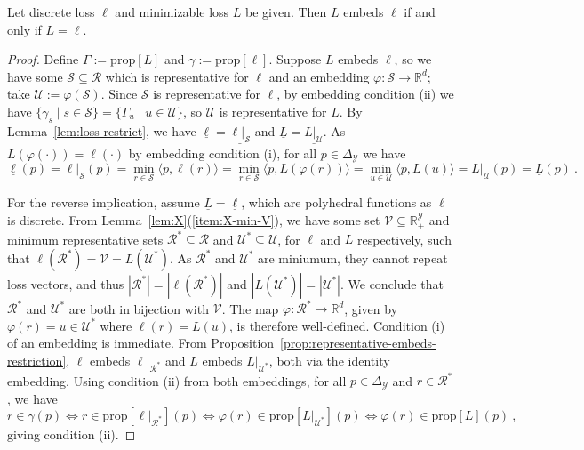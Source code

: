 \documentclass[twoside,11pt]{article}
\newcommand{\Comments}{1}
\newcommand{\mytodo}[2]{\ifnum\Comments=1%
  \todo[linecolor=#1!80!black,backgroundcolor=#1,bordercolor=#1!80!black]{#2}\fi}
\newcommand{\raft}[1]{\mytodo{green!20!white}{RF: #1}}
\newcommand{\jessiet}[1]{\mytodo{teal!20!white}{JF: #1}}
\newcommand{\reals}{\mathbb{R}}
\newcommand{\prop}[1]{\mathrm{prop}[#1]}
\newcommand{\simplex}{\Delta_\Y}
\newcommand{\R}{\mathcal{R}}
\newcommand{\Sc}{\mathcal{S}}
\newcommand{\U}{\mathcal{U}}
\newcommand{\V}{\mathcal{V}}
\newcommand{\Y}{\mathcal{Y}}
\newcommand{\risk}[1]{\underline{#1}}
\newcommand{\inprod}[2]{\langle #1, #2 \rangle}%
\begin{document}
\begin{proposition}\label{prop:embed-bayes-risks}
  Let discrete loss $\ell$ and minimizable loss $L$ be given.
  Then $L$ embeds $\ell$ if and only if $\risk{L}=\risk{\ell}$.
\end{proposition}
\begin{proof}
  Define $\Gamma := \prop{L}$ and $\gamma := \prop{\ell}$.
  Suppose $L$ embeds $\ell$, so we have some $\Sc\subseteq \R$ which is representative for $\ell$ and an embedding $\varphi:\Sc\to\reals^d$; take $\U := \varphi(\Sc)$.
  Since $\Sc$ is representative for $\ell$, by embedding condition (ii) we have $\{\gamma_s \mid s\in\Sc\} = \{\Gamma_u \mid u\in\U\}$, so $\U$ is representative for $L$.
  By Lemma~\ref{lem:loss-restrict}, we have $\risk{\ell} = \risk{\ell|_{\Sc}}$ and $\risk{L} = \risk{L|_{\U}}$.
  As $L(\varphi(\cdot)) = \ell(\cdot)$ by embedding condition (i), for all $p\in\simplex$ we have
  \begin{equation*}
    \risk{\ell}(p) = \risk{\ell|_\Sc}(p) = \min_{r \in \Sc}\inprod{p}{\ell(r)} = \min_{r \in \Sc}\inprod{p}{L(\varphi(r))} = \min_{u \in \U}\inprod{p}{L(u)} = \risk{L|_\U}(p) = \risk{L}(p)~.
  \end{equation*}
  
	For the reverse implication, assume $\risk{L} = \risk{\ell}$, which are polyhedral functions as $\ell$ is discrete.
  From Lemma~\ref{lem:X}(\ref{item:X-min-V}), we have some set $\V\subseteq\reals^\Y_+$ and minimum representative sets $\R^* \subseteq \R$ and $\U^* \subseteq \U$, for $\ell$ and $L$ respectively, such that $\ell(\R^*) = \V = L(\U^*)$.
  As $\R^*$ and $\U^*$ are miniumum, they cannot repeat loss vectors, and thus $|\R^*|=|\ell(\R^*)|$ and $|L(\U^*)|=|\U^*|$.
  We conclude that $\R^*$ and $\U^*$ are both in bijection with $\V$.
  The map $\varphi :\R^* \to \reals^d$, given by $\varphi(r) = u \in \U^*$ where $\ell(r) = L(u)$, is therefore well-defined.
  Condition (i) of an embedding is immediate.
  From Proposition~\ref{prop:representative-embeds-restriction}, $\ell$ embeds $\ell|_{\R^*}$ and $L$ embeds $L|_{\U^*}$, both via the identity embedding.
  Using condition (ii) from both embeddings, for all $p\in\simplex$ and $r\in\R^*$, we have
  \begin{equation*}
    r \in \gamma(p) \iff r \in \prop{\ell|_{\R^*}}(p) \iff \varphi(r) \in \prop{L|_{\U^*}}(p)
    \iff \varphi(r) \in \prop{L}(p)~,
  \end{equation*}
  giving condition (ii).
\end{proof}
\end{document}
